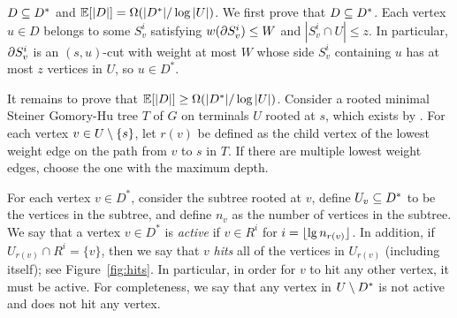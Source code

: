\BL{}
$D\subseteq D^*$ and $\mathbb E[|D|] = \Omega(|D^*|/\log|U|)$.
\EL
\BP
We first prove that $D\subseteq D^*$. Each vertex $u\in D$ belongs to some $S^i_v$ satisfying $w(\partial S^i_v)\le W$ and $|S^i_v\cap U|\le z$. %
In particular, $\partial S^i_v$ is an $(s,u)$-cut with weight at most $ W$ whose side $S^i_v$ containing $u$ has at most $z$ vertices in $U$, so $u\in D^*$.

It remains to prove that $\mathbb E[|D|]\ge\Omega(|D^*|/\log|U|)$. 
Consider a rooted minimal Steiner Gomory-Hu tree $T$ of $G$ on terminals $U$ rooted at $s$, which exists by . For each vertex $v\in U\setminus \{s\}$, let $r(v)$ be defined as the child vertex of the lowest weight edge on the path from $v$ to $s$ in $T$. If there are multiple lowest weight edges, choose the one with the maximum depth. %


For each vertex $v\in D^*$, consider the subtree rooted at $v$, define $U_v\subseteq D^*$ to be the vertices in the subtree, and define $n_v$ as the number of vertices in the subtree. We say that a vertex $v\in D^*$ is \emph{active} if $v\in R^i$ for $i=\lfloor\lg n_{r(v)}\rfloor$. In addition, if $U_{r(v)}\cap R^i=\{v\}$, then we say that $v$ \emph{hits} all of the vertices in $U_{r(v)}$ (including itself); see Figure~\ref{fig:hits}. In particular, in order for $v$ to hit any other vertex, it must be active. For completeness, we say that any vertex in $U\setminus D^*$ is not active and does not hit any vertex.


